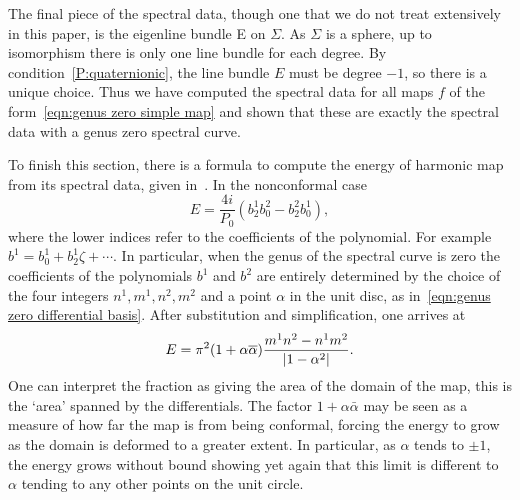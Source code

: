 \documentclass{article}
\begin{document}



The final piece of the spectral data, though one that we do not treat extensively in this paper, is the eigenline bundle E on $\Sigma$. As $\Sigma$ is a sphere, up to isomorphism there is only one line bundle for each degree. By condition~\ref{P:quaternionic}, the line bundle $E$ must be degree $-1$, so there is a unique choice. Thus we have computed the spectral data for all maps $f$ of the form~\eqref{eqn:genus zero simple map} and shown that these are exactly the spectral data with a genus zero spectral curve.

To finish this section, there is a formula to compute the energy of harmonic map from its spectral data, given in~\cite[Theorem 12.17]{Hitchin1990}. In the nonconformal case
\[
E = \frac{4i}{P_0} (b^1_2 b^2_0 - b^2_2 b^1_0),
\]
where the lower indices refer to the coefficients of the polynomial. For example $b^1 = b^1_0 + b^1_2 \zeta + \cdots$. In particular, when the genus of the spectral curve is zero the coefficients of the polynomials $b^1$ and $b^2$ are entirely determined by the choice of the four integers $n^1,m^1,n^2, m^2$ and a point $\alpha$ in the unit disc, as in~\eqref{eqn:genus zero differential basis}. After substitution and simplification, one arrives at
\[
E = \pi^2(1+\alpha\overline{\alpha})\frac{m^1 n^2 - n^1 m^2}{\left|1-\alpha^2\right|}.
\]
One can interpret the fraction as giving the area of the domain of the map, this is the `area' spanned by the differentials. 
The factor $1+\alpha\bar{\alpha}$ may be seen as a measure of how far the map is from being conformal, forcing the energy to grow as the domain is deformed to a greater extent. 
In particular, as $\alpha$ tends to $\pm 1$, the energy grows without bound showing yet again that this limit is different to $\alpha$ tending to any other points on the unit circle.
\end{document}
